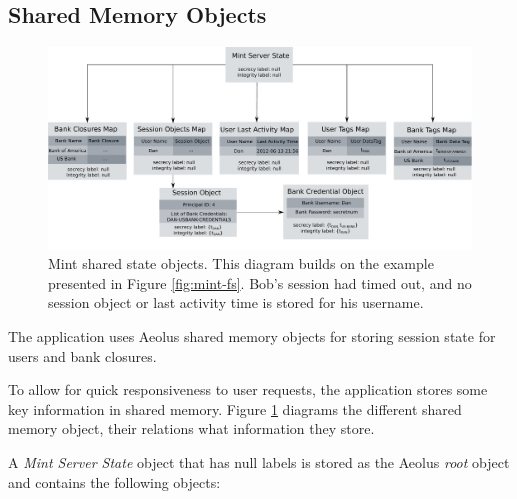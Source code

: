 \subsection{Shared Memory Objects}
\label{sec:mint-smo}

\begin{figure}[h]
\centering
\includegraphics[width=\textwidth,height=\textheight,keepaspectratio]{figures/mint-shared-state}
\caption{Mint shared state objects. This diagram builds on the example presented in Figure \ref{fig:mint-fs}. Bob's session had timed out, and no session object or last activity time is stored for his username.}
\label{fig:mint-ss}
\end{figure}

The application uses Aeolus shared memory objects for storing session state for users and bank closures.

To allow for quick responsiveness to user requests, the application stores some key information in shared memory. Figure \ref{fig:mint-ss} diagrams the different shared memory object, their relations what information they store.

A \emph{Mint Server State} object that has null labels is stored as the Aeolus \emph{root} object and contains the following objects:

